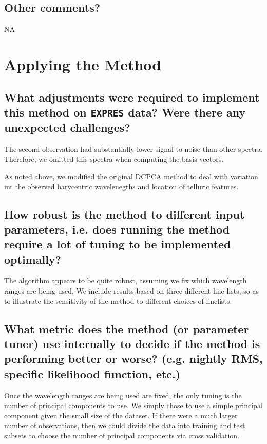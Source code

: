 \documentclass[12pt]{article}
\begin{document}
\subsection{Other comments?}

NA

\section{Applying the Method}
\subsection{What adjustments were required to implement this method on \texttt{EXPRES} data?  Were there any unexpected challenges?}

The second observation had substantially lower signal-to-noise than other spectra.
Therefore, we omitted this spectra when computing the basis vectors.

As noted above, we modified the original DCPCA method to deal with variation int the observed barycentric wavelenegths and location of telluric features.

\subsection{How robust is the method to different input parameters, i.e. does running the method require a lot of tuning to be implemented optimally?}

The algorithm appears to be quite robust, assuming we fix which wavelength ranges are being used.
We include results based on three different line lists, so as to illustrate the sensitivity of the method to different choices of linelists.

\subsection{What metric does the method (or parameter tuner) use internally to decide if the method is performing better or worse?  (e.g. nightly RMS, specific likelihood function, etc.)}

Once the  wavelength ranges are being used are fixed, the only tuning is the number of principal components to use.
We simply chose to use a simple principal component given the small size of the dataset.
If there were a much larger number of observations, then we could divide the data into training and test subsets to choose the number of principal components via cross validation.
\end{document}
